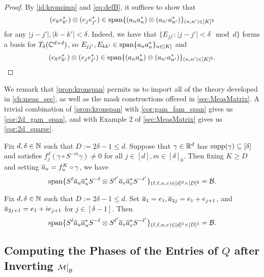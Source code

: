 \begin{proof}
  By \eqref{id:kronsimp} and \eqref{eq:defB}, it suffices to show that $$(e_k e_{k'}^*) \otimes (e_j e_{j'}^*) \in \operatorname{span}\{(a_n a_n^*) \otimes (a_{n'} a_{n'}^*)\}_{(n, n') \in [K]^2}$$ for any $|j - j'|, |k - k'| < \delta$.  Indeed, we have that $\{E_{jj'} : |j - j'| < \delta \mod d\}$ forms a basis for $T_\delta(\mathbb{C}^{d \times d})$, so $E_{j j'}, E_{k k'} \in \operatorname{span}\{a_n a_n^*\}_{n \in [K]}$ and \[(e_k e_{k'}^*) \otimes (e_j e_{j'}^*) \in \operatorname{span}\{(a_n a_n^*) \otimes (a_{n'} a_{n'}^*)\}_{(n, n') \in [K]^2}.\]
\end{proof}

We remark that \cref{prop:kronspan} permits us to import all of the theory developed in \cref{ch:meas_sec}, as well as the mask constructions offered in \cref{sec:MeasMatrix}.  A trivial combination of \cref{prop:kronspan} with \cref{cor:gam_fam_span} gives us \cref{cor:2d_gam_span}, and with Example 2 of \cref{sec:MeasMatrix} gives us \cref{cor:2d_sparse}.

\begin{corollary} \label{cor:2d_gam_span}
  Fix $d, \delta \in \mathbb{N}$ such that $D := 2 \delta - 1 \le d$.  Suppose that $\gamma \in \mathbb{R}^d$ has $\operatorname{supp}(\gamma) \subseteq [\delta]$ and satisfies $f_j^d(\gamma \circ S^{-m} \gamma) \neq 0$ for all $j \in [d], m \in [\delta]_0$.  Then fixing $K \ge D$ and setting $\overline{a}_u = f^K_u \circ \gamma$, we have \[\operatorname{span}\{S^\ell \overline{a}_u \overline{a}_u^* S^{-\ell} \otimes S^{\ell'} \overline{a}_v \overline{a}_v^* S^{-\ell'}\}_{(\ell, \ell, u, v) \in [d]^2 \times [D]^2} = \mathcal{B}.\]
\end{corollary}

\begin{corollary} \label{cor:2d_sparse}
  Fix $d, \delta \in \mathbb{N}$ such that $D := 2 \delta - 1 \le d$.  Set $\overline{a}_1 = e_1, \overline{a}_{2j} = e_1 + e_{j+1}$, and $\overline{a}_{2j + 1} = e_1 + i e_{j+1}$ for $j \in [\delta - 1]$.  Then \[\operatorname{span}\{S^\ell \overline{a}_u \overline{a}_u^* S^{-\ell} \otimes S^{\ell'} \overline{a}_v \overline{a}_v^* S^{-\ell'}\}_{(\ell, \ell, u, v) \in [d]^2 \times [D]^2} = \mathcal{B}.\]
\end{corollary}

\subsection{Computing the Phases of the Entries of $Q$ after Inverting $\mathcal{M} \big|_{\mathcal{B}}$}
\label{sec:Getphases}

